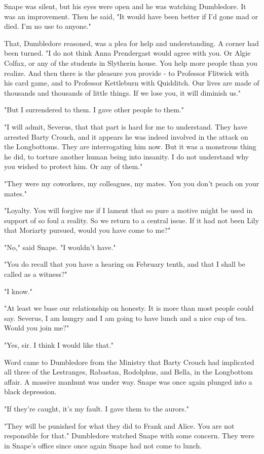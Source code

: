 Snape was silent, but his eyes were open and he was watching Dumbledore. It was an improvement. Then he said, "It would have been better if I'd gone mad or died. I'm no use to anyone."

That, Dumbledore reasoned, was a plea for help and understanding. A corner had been turned. "I do not think Anna Prendergast would agree with you. Or Algie Colfax, or any of the students in Slytherin house. You help more people than you realize. And then there is the pleasure you provide - to Professor Flitwick with his card game, and to Professor Kettleburn with Quidditch. Our lives are made of thousands and thousands of little things. If we lose you, it will diminish us."

"But I surrendered to them. I gave other people to them."

"I will admit, Severus, that that part is hard for me to understand. They have arrested Barty Crouch, and it appears he was indeed involved in the attack on the Longbottoms. They are interrogating him now. But it was a monstrous thing he did, to torture another human being into insanity. I do not understand why you wished to protect him. Or any of them."

"They were my coworkers, my colleagues, my mates. You{\el} you don't peach on your mates."

"Loyalty. You will forgive me if I lament that so pure a motive might be used in support of so foul a reality. So we return to a central issue. If it had not been Lily that Moriarty pursued, would you have come to me?"

"No," said Snape. "I wouldn't have."

"You do recall that you have a hearing on February tenth, and that I shall be called as a witness?"

"I know."

"At least we base our relationship on honesty. It is more than most people could say. Severus, I am hungry and I am going to have lunch and a nice cup of tea. Would you join me?"

"Yes, sir. I think I would like that."

Word came to Dumbledore from the Ministry that Barty Crouch had implicated all three of the Lestranges, Rabastan, Rodolphus, and Bella, in the Longbottom affair. A massive manhunt was under way. Snape was once again plunged into a black depression.

"If they're caught, it's my fault. I gave them to the aurors."

"They will be punished for what they did to Frank and Alice. You are not responsible for that." Dumbledore watched Snape with some concern. They were in Snape's office since once again Snape had not come to lunch.

